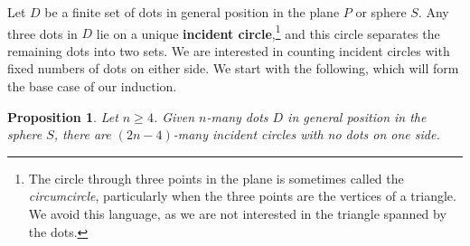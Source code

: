 \documentclass[11pt,oneside]{amsart}
\newtheorem{prop}[thm]{Proposition}
\theoremstyle{definition}
\theoremstyle{remark}
\numberwithin{equation}{section}
\begin{document}
Let $D$ be a finite set of dots in general position in the plane $P$ or sphere $S$. 
Any three dots in $D$ lie on a unique \textbf{incident circle},\footnote{
The circle through three points in the plane is sometimes called the \emph{circumcircle}, particularly when the three points are the vertices of a triangle. We avoid this language, as we are not interested in the triangle spanned by the dots.}
and this circle separates the remaining dots into two sets. 
%
%
%
We are interested in counting incident circles %
with fixed numbers of dots on either side. We start with the following, which will form the base case of our induction.

\begin{prop}\label{prop: incident0}
Let $n\geq4$. Given $n$-many dots $D$ in general position in the sphere $S$, there are $(2n-4)$-many incident circles with no dots on one side.
\end{prop}
\end{document}
